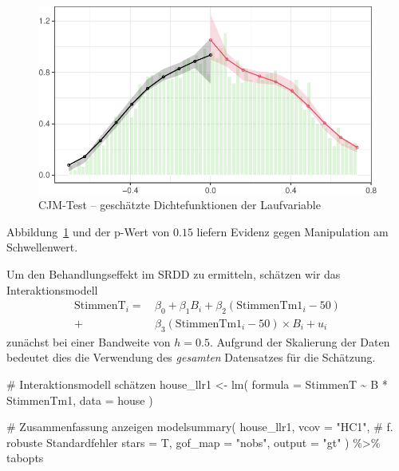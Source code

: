 \documentclass[
  a4paper,
  DIV=11,
  oneside]{scrreprt}
\newenvironment{Shaded}{\begin{snugshade}}{\end{snugshade}}
\newcommand{\AttributeTok}[1]{\textcolor[rgb]{0.40,0.45,0.13}{#1}}
\newcommand{\CommentTok}[1]{\textcolor[rgb]{0.37,0.37,0.37}{#1}}
\newcommand{\FunctionTok}[1]{\textcolor[rgb]{0.28,0.35,0.67}{#1}}
\newcommand{\NormalTok}[1]{\textcolor[rgb]{0.00,0.23,0.31}{#1}}
\newcommand{\OtherTok}[1]{\textcolor[rgb]{0.00,0.23,0.31}{#1}}
\newcommand{\SpecialCharTok}[1]{\textcolor[rgb]{0.37,0.37,0.37}{#1}}
\newcommand{\StringTok}[1]{\textcolor[rgb]{0.13,0.47,0.30}{#1}}
\begin{document}
\begin{figure}[t]

{\centering \includegraphics{RDD_files/figure-pdf/fig-cjm-lee-1.pdf}

}

\caption{\label{fig-cjm-lee}CJM-Test -- geschätzte Dichtefunktionen der
Laufvariable}

\end{figure}

Abbildung~\ref{fig-cjm-lee} und der p-Wert von \(0.15\) liefern Evidenz
gegen Manipulation am Schwellenwert.

Um den Behandlungseffekt im SRDD zu ermitteln, schätzen wir das
Interaktionsmodell \begin{align*}
  \text{StimmenT}_i =&\, \beta_0 + \beta_1 B_i + \beta_2 (\text{StimmenTm1}_i - 50)\\ 
  +&\, \beta_3(\text{StimmenTm1}_i - 50)\times B_i + u_i
\end{align*} zunächst bei einer Bandweite von \(h = 0.5\). Aufgrund der
Skalierung der Daten bedeutet dies die Verwendung des \emph{gesamten}
Datensatzes für die Schätzung.

\begin{Shaded}
\begin{Highlighting}[]
\CommentTok{\# Interaktionsmodell schätzen}
\NormalTok{house\_llr1 }\OtherTok{\textless{}{-}} \FunctionTok{lm}\NormalTok{(}
  \AttributeTok{formula =}\NormalTok{ StimmenT }\SpecialCharTok{\textasciitilde{}}\NormalTok{ B }\SpecialCharTok{*}\NormalTok{ StimmenTm1, }
  \AttributeTok{data =}\NormalTok{ house}
\NormalTok{)}

\CommentTok{\# Zusammenfassung anzeigen  }
\FunctionTok{modelsummary}\NormalTok{(}
\NormalTok{  house\_llr1, }
  \AttributeTok{vcov =} \StringTok{"HC1"}\NormalTok{, }\CommentTok{\# f. robuste Standardfehler}
  \AttributeTok{stars =}\NormalTok{ T, }
  \AttributeTok{gof\_map =} \StringTok{"nobs"}\NormalTok{, }
  \AttributeTok{output =} \StringTok{"gt"}
\NormalTok{) }\SpecialCharTok{\%\textgreater{}\%} 
\NormalTok{  tabopts}
\end{Highlighting}
\end{Shaded}
\end{document}
